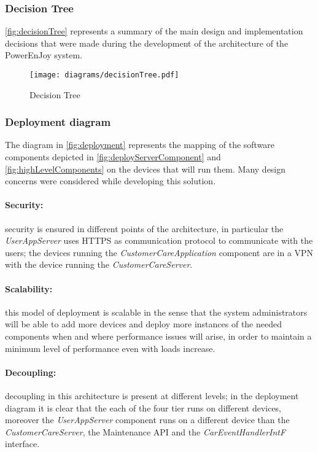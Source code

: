\subsubsection{Decision Tree}
\autoref{fig:decisionTree} represents a summary of the main design and implementation decisions that were made during the development of the architecture of the PowerEnJoy system.\\

\begin{figure}[h!]
	\centering
	\texttt{[image: diagrams/decisionTree.pdf]}
	\caption{
		\label{fig:decisionTree}  
		Decision Tree
	}
\end{figure}
\clearpage
\subsubsection{Deployment diagram}
The diagram in \autoref{fig:deployment} represents the mapping of the software components depicted in \autoref{fig:deployServerComponent} and \autoref{fig:highLevelComponents} on the devices that will run them. Many design concerns were considered while developing this solution.
\paragraph{Security:}security is ensured in different points of the architecture, in particular the \emph{UserAppServer} uses HTTPS as communication protocol to communicate with the users; the devices running the \emph{CustomerCareApplication} component are in a VPN with the device running the \emph{CustomerCareServer}.
\paragraph{Scalability:}this model of deployment is scalable in the sense that the system administrators will be able to add more devices and deploy more instances of the needed components when and where performance issues will arise, in order to maintain a minimum level of performance even with loads increase.
\paragraph{Decoupling:}decoupling in this architecture is present at different levels; in the deployment diagram it is clear that the each of the four tier runs on different devices, moreover the \emph{UserAppServer} component runs on a different device than the \emph{CustomerCareServer}, the Maintenance API and the \textit{CarEventHandlerIntF} interface.

